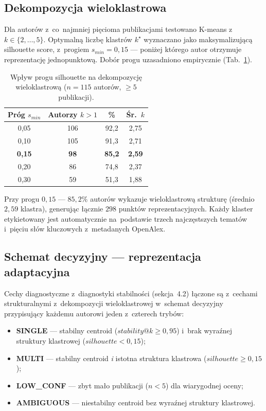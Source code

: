 \documentclass[a4paper,11pt,twocolumn]{article}
\begin{document}
\subsection{Dekompozycja wieloklastrowa}

Dla autorów z~co~najmniej pięcioma publikacjami testowano K-means
z~$k \in \{2, \ldots, 5\}$. Optymalną liczbę klastrów $k^\star$
wyznaczano jako maksymalizującą silhouette score, z~progiem
$s_{min}=0{,}15$ --- poniżej którego autor otrzymuje reprezentację
jednopunktową. Dobór progu uzasadniono empirycznie (Tab.~\ref{tab:threshold}).

\begin{table}[t]
\centering
\caption{Wpływ progu silhouette na dekompozycję wieloklastrową
($n=115$ autorów, $\geq 5$ publikacji).}
\label{tab:threshold}
\small
\begin{tabular}{@{}cccc@{}}
\toprule
Próg $s_{min}$ & Autorzy $k\!>\!1$ & \% & Śr.\ $k$ \\
\midrule
0,05 & 106 & 92,2 & 2,75 \\
0,10 & 105 & 91,3 & 2,71 \\
\textbf{0,15} & \textbf{98} & \textbf{85,2} & \textbf{2,59} \\
0,20 & 86  & 74,8 & 2,37 \\
0,30 & 59  & 51,3 & 1,88 \\
\bottomrule
\end{tabular}
\end{table}

Przy progu $0{,}15$ --- $85{,}2\%$ autorów wykazuje wieloklastrową
strukturę (średnio $2{,}59$ klastra), generując łącznie $298$ punktów
reprezentacyjnych. Każdy klaster etykietowany jest automatycznie
na~podstawie trzech najczęstszych tematów i~pięciu słów kluczowych
z~metadanych OpenAlex.

\subsection{Schemat decyzyjny --- reprezentacja adaptacyjna}
\label{sec:adaptive}

Cechy diagnostyczne z~diagnostyki stabilności (sekcja~4.2) łączone
są z~cechami strukturalnymi z~dekompozycji wieloklastrowej w~schemat
decyzyjny przypisujący każdemu autorowi jeden z~czterech trybów:
\begin{itemize}
  \item \textbf{SINGLE} --- stabilny centroid ($stability@k \geq 0{,}95$)
        i~brak wyraźnej struktury klastrowej ($silhouette < 0{,}15$);
  \item \textbf{MULTI} --- stabilny centroid \emph{i} istotna struktura
        klastrowa ($silhouette \geq 0{,}15$);
  \item \textbf{LOW\_CONF} --- zbyt mało publikacji ($n < 5$) dla
        wiarygodnej oceny;
  \item \textbf{AMBIGUOUS} --- niestabilny centroid bez wyraźnej struktury
        klastrowej.
\end{itemize}
\end{document}
